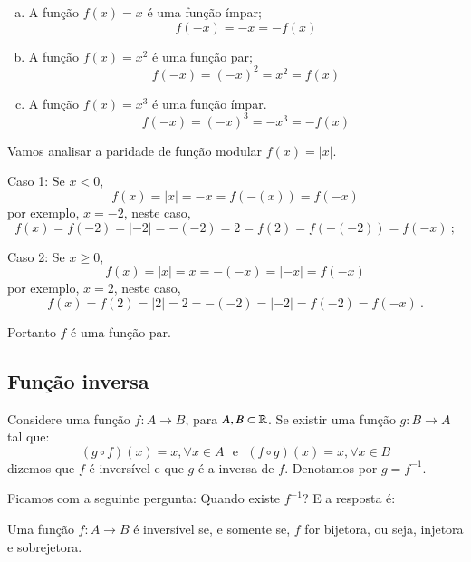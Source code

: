  
 \begin{exem}
  \begin{enumerate}[a)]
   \item A função $f(x)= x$ é uma função ímpar;
   \[f(-x)= -x= -f(x) \]
   \item A função $f(x)= x^2$ é uma função par;
   \[f(-x)= (-x)^2= x^2 = f(x) \]
   \item A função $f(x)= x^3$ é uma função ímpar.
   \[f(-x)= (-x)^3= -x^3= -f(x)\]
  \end{enumerate}
 \end{exem}
 
 \begin{exem}
  Vamos analisar a paridade de função modular $f(x)= |x|$.
  
  Caso 1: Se $x < 0$,
  \[f(x)= |x|= -x= f(-(x))= f(-x)\]
  por exemplo, $x= -2$, neste caso,
  \[f(x)= f(-2)= |-2|= -(-2)= 2= f(2)= f(-(-2))= f(-x) \ ;\]
  
  Caso 2: Se $x \geq 0$,
  \[f(x)= |x|= x= -(-x)= |-x|= f(-x)\]
  por exemplo, $x= 2$, neste caso,
  \[f(x)= f(2)= |2|= 2= -(-2)= |-2|= f(-2)= f(-x) \ .\]
  
  Portanto $f$ é uma função par.
 \end{exem}
  
  
  \subsection{Função inversa}

 Considere uma função $f: A \rightarrow B$, para $A, B \subset \mathbb{R}$. Se existir uma função $g: B \rightarrow A$ tal que:
 \[(g \circ f)(x)= x, \forall x \in A \ \ \ \text {e} \ \ \
 (f \circ g)(x)= x, \forall x \in B\]
 dizemos que $f$ é inversível e que $g$ é a inversa de $f$. Denotamos por $g= f^{-1}$.
 
 Ficamos com a seguinte pergunta: Quando existe $f^{-1}$? E a resposta é:
 
 \vskip0.3cm
 
 \colorbox{azul}{
 \begin{minipage}{0.9\linewidth}
 \begin{center}
 Uma função $f: A \to B$ é inversível se, e somente se, $f$ for bijetora, ou seja, injetora e sobrejetora.
 \end{center}
 \end{minipage}}

 \vskip0.3cm

